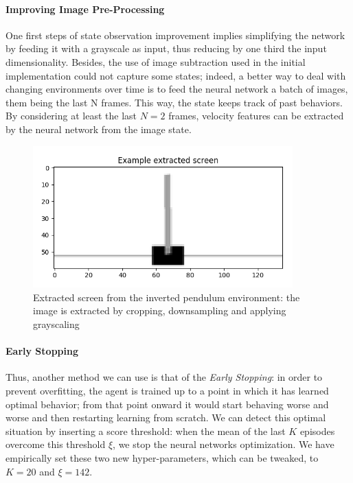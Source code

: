 \documentclass[11pt]{article}
\begin{document}
\paragraph{Improving Image Pre-Processing}
One first steps of state observation improvement implies simplifying the network by feeding it with a grayscale as input, thus reducing by one third the input dimensionality. Besides, the use of image subtraction used in the initial implementation could not capture some states; indeed, a better way to deal with changing environments over time is to feed the neural network a batch of images, them being the last N frames. This way, the state keeps track of past behaviors. By considering at least the last $N=2$ frames, velocity features can be extracted by the neural network from the image state.

\begin{figure}[h!]
	\label{fig:ExampleExtractScreen}
	\centering
	\includegraphics[width=10cm]{images/example_extracted_screen.png}
	\caption[Pre-processed image of the environment]{Extracted screen from the inverted pendulum environment: the image is extracted by cropping, downsampling and applying grayscaling}
\end{figure}

\paragraph{Early Stopping}
Thus, another method we can use is that of the \textit{Early Stopping}:  in order to prevent overfitting, the agent is trained up to a point in which it has learned optimal behavior; from that point onward it would start behaving worse and worse and then restarting learning from scratch. We can detect this optimal situation by inserting a score threshold: when the mean of the last $K$ episodes overcome this threshold $\xi$, we stop the neural networks optimization. We have empirically set these two new hyper-parameters, which can be tweaked, to $K = 20$ and $\xi= 142$.\\
\end{document}
